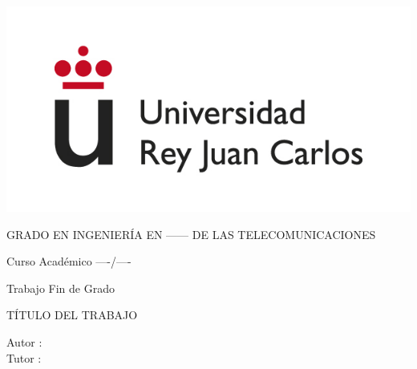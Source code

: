 \documentclass[a4paper, 12pt]{book}
\begin{document}
	\begin{titlepage}
		\centering
		\includegraphics[scale=0.5]{img/logo_urjc.jpg}
		\vspace{3cm}
		
		\Large
		GRADO EN INGENIERÍA EN ------ DE LAS TELECOMUNICACIONES
		
		\vspace{0.4cm}
		
		\large
		Curso Académico ----/----
		
		\vspace{0.8cm}
		
		Trabajo Fin de Grado
		
		\vspace{2.5cm}		
		\LARGE		
		TÍTULO DEL TRABAJO
		
		\vspace{2.5 cm}
		
		\large
		Autor :  \\
		Tutor : 
		\afterpage{\null\newpage}
		\pagestyle{empty}
	\end{titlepage}
	
	
	
	
	
	\tableofcontents
	\setcounter{page}{1}
	\mainmatter

	
%	
%	
%	
%	
%	

	
	
	
\end{document}
